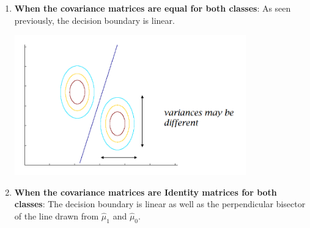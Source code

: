 \documentclass[
]{article}
\providecommand{\tightlist}{%
  \setlength{\itemsep}{0pt}\setlength{\parskip}{0pt}}
\begin{document}
\begin{enumerate}
\def\labelenumi{\arabic{enumi}.}
\tightlist
\item
  \textbf{When the covariance matrices are equal for both classes}: As
  seen previously, the decision boundary is linear.

\includegraphics[width=10cm]{./images/equal_var.png} 

\item 
    \textbf{When the covariance
matrices are Identity matrices for both classes}: The decision boundary
is linear as well as the perpendicular bisector of the line drawn from
\(\hat{\mu}_1\) and \(\hat{\mu}_0\).


\end{enumerate}
\end{document}

